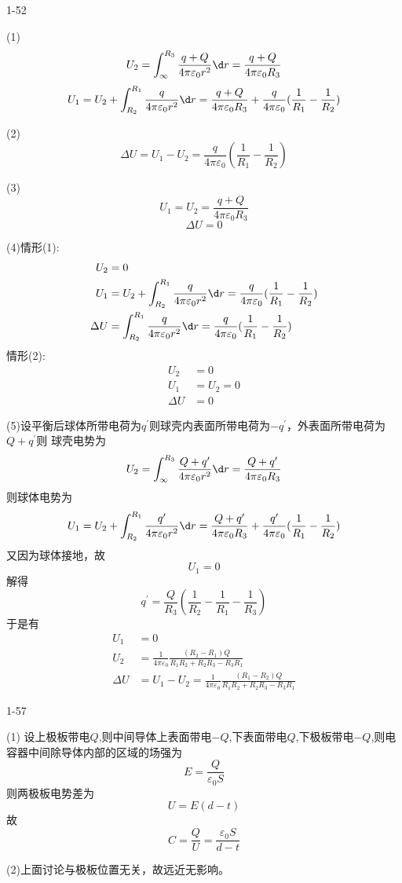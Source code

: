 \documentclass{phyasgn}
\begin{document}
{\heiti\color{red} 1-52}
\begin{sol}
(1)
$$U_2=\int_{\infty}^{R_3}\frac{q+Q}{4\pi\varepsilon_0r^2}\d r=\frac{q+Q}{4\pi\varepsilon_0R_3}$$
$$U_1=U_2+\int_{R_2}^{R_1}\frac{q}{4\pi\varepsilon_0r^2}\d r=\frac{q+Q}{4\pi\varepsilon_0R_3}+\frac{q}{4\pi\varepsilon_0}(\frac{1}{R_1}-\frac{1}{R_2})$$
\par
(2)$$\Delta U=U_1-U_2=\frac{q}{4\pi\varepsilon_0}(\frac{1}{R_1}-\frac{1}{R_2})$$\par
(3)$$U_1=U_2=\frac{q+Q}{4\pi\varepsilon_0R_3}$$
$$\Delta U=0$$\par
(4)情形(1):$$
\begin{aligned}
    U_2&=0\\
    U_1&=U_2+\int_{R_2}^{R_1}\frac{q}{4\pi\varepsilon_0r^2}\d r=\frac{q}{4\pi\varepsilon_0}(\frac{1}{R_1}-\frac{1}{R_2})\\
    \Delta U&=\int_{R_2}^{R_1}\frac{q}{4\pi\varepsilon_0r^2}\d r=\frac{q}{4\pi\varepsilon_0}(\frac{1}{R_1}-\frac{1}{R_2})
\end{aligned}
$$
情形(2):$$
\begin{aligned}
    U_2&=0\\
    U_1&=U_2=0\\
    \Delta U&=0
\end{aligned}
$$\par
(5)设平衡后球体所带电荷为$q^{\prime}$则球壳内表面所带电荷为$-q^{\prime}$，外表面所带电荷为$Q+q^{\prime}$则
球壳电势为
$$
U_2=\int_{\infty}^{R_3}\frac{Q+q^{\prime}}{4\pi\varepsilon_0r^2}\d r=\frac{Q+q^{\prime}}{4\pi\varepsilon_0R_3}
$$
则球体电势为$$U_1=U_2+\int_{R_2}^{R_1}\frac{q^{\prime}}{4\pi\varepsilon_0r^2}\d r=\frac{Q+q^{\prime}}{4\pi\varepsilon_0R_3}+\frac{q^{\prime}}{4\pi\varepsilon_0}(\frac{1}{R_1}-\frac{1}{R_2})$$
又因为球体接地，故
$$U_1=0$$
解得
$$q^\prime=\frac{Q}{R_3}(\frac{1}{R_2}-\frac{1}{R_1}-\frac{1}{R_3})$$
于是有
$$
\begin{aligned}
    U_1&=0\\
    U_2&=\frac{1}{4\pi\varepsilon_0}\frac{(R_2-R_1)Q}{R_1R_2+R_2R_3-R_3R_1}\\
    \Delta U&=U_1-U_2=\frac{1}{4\pi\varepsilon_0}\frac{(R_1-R_2)Q}{R_1R_2+R_2R_3-R_3R_1}
\end{aligned}
$$
\end{sol}\par

{\heiti\color{red} 1-57}
\begin{sol}
(1)
设上极板带电$Q$,则中间导体上表面带电$-Q$,下表面带电$Q$,下极板带电$-Q$,则电容器中间除导体内部的区域的场强为
$$E=\frac{Q}{\varepsilon_0S}$$
则两极板电势差为$$U=E(d-t)$$
故
$$C=\frac{Q}{U}=\frac{\varepsilon_0S}{d-t}$$\par
(2)上面讨论与极板位置无关，故远近无影响。
\end{sol}\par
\end{document}
